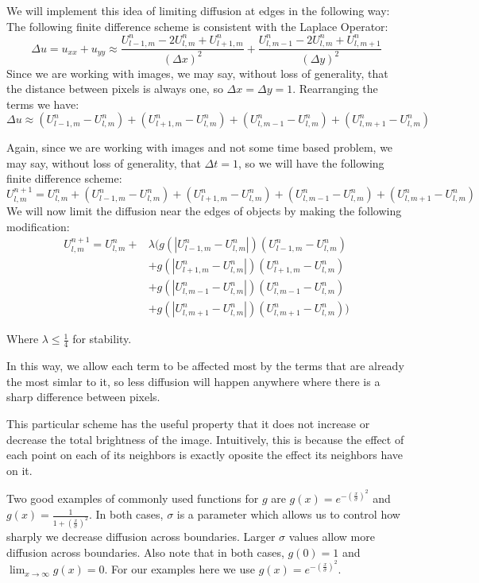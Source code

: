 We will implement this idea of limiting diffusion at edges in the following way:
The following finite difference scheme is consistent with the Laplace Operator:
\[\Delta u = u_{xx}+u_{yy} \approx \frac{U_{l-1,m}^n - 2 U_{l,m}^n + U_{l+1,m}^n}{(\Delta x)^2} + \frac{U_{l,m-1}^n-2 U_{l,m}^n + U_{l,m+1}^n}{(\Delta y)^2}\]
Since we are working with images, we may say, without loss of generality, that the distance between pixels is always one, so $\Delta x = \Delta y = 1$. Rearranging the terms we have:
\[\Delta u \approx (U_{l-1,m}^n - U_{l,m}^n) + (U_{l+1,m}^n - U_{l,m}^n) + (U_{l,m-1}^n - U_{l,m}^n) + (U_{l,m+1}^n - U_{l,m}^n)\]

Again, since we are working with images and not some time based problem, we may say, without loss of generality, that $\Delta t = 1$, so we will have the following finite difference scheme:
\[U_{l,m}^{n+1} = U_{l,m}^n + (U_{l-1,m}^n - U_{l,m}^n) + (U_{l+1,m}^n - U_{l,m}^n) + (U_{l,m-1}^n - U_{l,m}^n) + (U_{l,m+1}^n - U_{l,m}^n)\]
We will now limit the diffusion near the edges of objects by making the following modification:
\begin{align*}
U_{l,m}^{n+1} = U_{l,m}^n + & \lambda (g(|U_{l-1,m}^n - U_{l,m}^n|)(U_{l-1,m}^n - U_{l,m}^n) \\
			&+ g(|U_{l+1,m}^n - U_{l,m}^n|)(U_{l+1,m}^n - U_{l,m}^n) \\
			&+ g(|U_{l,m-1}^n - U_{l,m}^n|)(U_{l,m-1}^n - U_{l,m}^n) \\
			&+ g(|U_{l,m+1}^n - U_{l,m}^n|)(U_{l,m+1}^n - U_{l,m}^n))
\end{align*}

Where $\lambda \leq \frac{1}{4}$ for stability.

In this way, we allow each term to be affected most by the terms that are already the most simlar to it, so less diffusion will happen anywhere where there is a sharp difference between pixels.

This particular scheme has the useful property that it does not increase or decrease the total brightness of the image.
Intuitively, this is because the effect of each point on each of its neighbors is exactly oposite the effect its neighbors have on it.

Two good examples of commonly used functions for $g$ are $g(x) = e^{-\left(\frac{x}{\sigma}\right)^2}$ and $g(x) = \frac{1}{1+\left(\frac{x}{\sigma}\right)^2}$. 
In both cases, $\sigma$ is a parameter which allows us to control how sharply we decrease diffusion across boundaries.
Larger $\sigma$ values allow more diffusion across boundaries.
Also note that in both cases, $g(0) = 1$ and $\displaystyle{\lim_{x\to \infty} g(x) = 0}$.
For our examples here we use $g(x)=e^{-\left(\frac{x}{\sigma}\right)^2}$.

